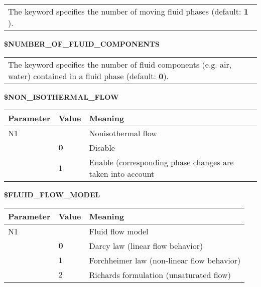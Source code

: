 \begin{center}
\begin{tabular*}{13.5cm}{p{}}
The keyword specifies the number of moving fluid phases (default: $\mathbf 1$).
\end{tabular*}
\end{center}

\vspace{0.5cm}

\hspace{1cm} {\bf \$NUMBER\_OF\_FLUID\_COMPONENTS}

\begin{center}
\begin{tabular*}{13.5cm}{p{}}
The keyword specifies the number of fluid components (e.g. air, water) contained in a
fluid phase (default: $\mathbf 0$).
\end{tabular*}
\end{center}

\vspace{0.5cm}

\hspace{1cm} {\bf \$NON\_ISOTHERMAL\_FLOW}

\begin{center}
\begin{tabular*}{13cm}{|p{}|p{}|p{8.75cm}|} \hline
Parameter& Value & Meaning \\ \hline \hline
%
N1 &     & Nonisothermal flow \\
   &$\mathbf 0$ & Disable \\
   &$ 1$ & Enable (corresponding phase changes are taken into account \\ \hline
\end{tabular*}
\end{center}

\vspace{0.5cm}

\newpage
\hspace{1cm} {\bf \$FLUID\_FLOW\_MODEL}

\begin{center}
\begin{tabular*}{13cm}{|p{}|p{}|p{8.75cm}|} \hline
Parameter& Value & Meaning \\ \hline \hline
%
N1 &     & Fluid flow model \\
   &$\mathbf 0$ & Darcy law (linear flow behavior) \\
   &$ 1$ & Forchheimer law (non-linear flow behavior) \\
   &$ 2$ & Richards formulation (unsaturated flow) \\ \hline
\end{tabular*}
\end{center}


